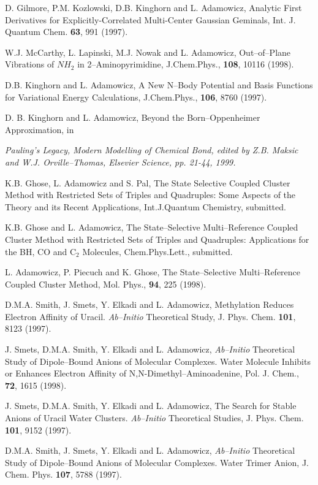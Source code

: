 {{\begin{thebibliography}{999}
D. Gilmore, P.M. Kozlowski, D.B. Kinghorn and 
L. Adamowicz, Analytic First Derivatives for
Explicitly-Correlated Multi-Center Gaussian Geminals, 
Int. J. Quantum Chem. {\bf 63}, 991 (1997).

W.J. McCarthy, L. Lapinski, M.J. Nowak and L. Adamowicz,
Out--of--Plane Vibrations of $NH_2$ in 2--Aminopyrimidine, 
J.Chem.Phys., {\bf 108}, 10116 (1998).  

D.B. Kinghorn and L. Adamowicz,
A New N--Body Potential and Basis Functions for
Variational Energy Calculations,
J.Chem.Phys., {\bf 106}, 8760 (1997).

D. B. Kinghorn and L. Adamowicz, 
Beyond the Born--Oppenheimer Approximation,
in {\em Pauling's Legacy,
Modern Modelling of Chemical Bond, 
edited by Z.B. Maksic and W.J. Orville--Thomas,
Elsevier Science, pp. 21-44, 1999.

K.B. Ghose, L. Adamowicz and S. Pal,
The State Selective Coupled Cluster Method with
Restricted Sets of Triples and Quadruples:
Some Aspects of the Theory and its Recent Applications,
Int.J.Quantum Chemistry, submitted.

K.B. Ghose and L. Adamowicz,
The State--Selective Multi--Reference Coupled Cluster
Method with Restricted Sets of Triples and Quadruples:
Applications for the BH, CO and C$_2$ Molecules,
Chem.Phys.Lett., submitted.


L. Adamowicz, P. Piecuch and K. Ghose, 
The State--Selective Multi--Reference
Coupled Cluster Method, Mol. Phys., 
{\bf 94}, 225 (1998).



D.M.A. Smith, J. Smets, Y. Elkadi and 
L. Adamowicz, Methylation Reduces
Electron Affinity of Uracil.  {\it Ab--Initio} 
Theoretical Study, J. Phys. Chem.
{\bf 101}, 8123 (1997).

J. Smets, D.M.A. Smith, Y. Elkadi 
and L. Adamowicz, {\it Ab--Initio} Theoretical Study
of Dipole--Bound Anions of Molecular 
Complexes.  Water Molecule Inhibits or
Enhances Electron Affinity of N,N-Dimethyl--Aminoadenine, 
Pol. J. Chem., {\bf 72}, 1615 (1998). 

J. Smets, D.M.A. Smith, Y. Elkadi and 
L. Adamowicz, The Search for Stable
Anions of Uracil Water Clusters.  {\it Ab--Initio} 
Theoretical Studies, J. Phys. Chem.
{\bf 101}, 9152 (1997).

D.M.A. Smith, J. Smets, Y. Elkadi and 
L. Adamowicz, {\it Ab--Initio} Theoretical Study
of Dipole--Bound Anions of Molecular 
Complexes.  Water Trimer Anion, J. Chem.
Phys.
{\bf 107}, 5788 (1997).

}
\end{thebibliography}}}
